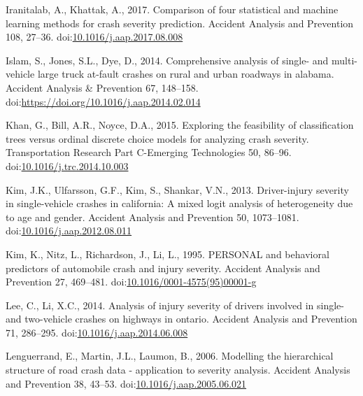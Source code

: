 \documentclass[]{elsarticle} %
\begin{document}
\leavevmode\hypertarget{ref-Iranitalab2017comparison}{}%
Iranitalab, A., Khattak, A., 2017. Comparison of four statistical and
machine learning methods for crash severity prediction. Accident
Analysis and Prevention 108, 27--36.
doi:\href{https://doi.org/10.1016/j.aap.2017.08.008}{10.1016/j.aap.2017.08.008}

\leavevmode\hypertarget{ref-Islam2014comprehensive}{}%
Islam, S., Jones, S.L., Dye, D., 2014. Comprehensive analysis of single-
and multi-vehicle large truck at-fault crashes on rural and urban
roadways in alabama. Accident Analysis \& Prevention 67, 148--158.
doi:\href{https://doi.org/https://doi.org/10.1016/j.aap.2014.02.014}{https://doi.org/10.1016/j.aap.2014.02.014}

\leavevmode\hypertarget{ref-Khan2015exploring}{}%
Khan, G., Bill, A.R., Noyce, D.A., 2015. Exploring the feasibility of
classification trees versus ordinal discrete choice models for analyzing
crash severity. Transportation Research Part C-Emerging Technologies 50,
86--96.
doi:\href{https://doi.org/10.1016/j.trc.2014.10.003}{10.1016/j.trc.2014.10.003}

\leavevmode\hypertarget{ref-Kim2013driver}{}%
Kim, J.K., Ulfarsson, G.F., Kim, S., Shankar, V.N., 2013. Driver-injury
severity in single-vehicle crashes in california: A mixed logit analysis
of heterogeneity due to age and gender. Accident Analysis and Prevention
50, 1073--1081.
doi:\href{https://doi.org/10.1016/j.aap.2012.08.011}{10.1016/j.aap.2012.08.011}

\leavevmode\hypertarget{ref-Kim1995personal}{}%
Kim, K., Nitz, L., Richardson, J., Li, L., 1995. PERSONAL and behavioral
predictors of automobile crash and injury severity. Accident Analysis
and Prevention 27, 469--481.
doi:\href{https://doi.org/10.1016/0001-4575(95)00001-g}{10.1016/0001-4575(95)00001-g}

\leavevmode\hypertarget{ref-Lee2014analysis}{}%
Lee, C., Li, X.C., 2014. Analysis of injury severity of drivers involved
in single- and two-vehicle crashes on highways in ontario. Accident
Analysis and Prevention 71, 286--295.
doi:\href{https://doi.org/10.1016/j.aap.2014.06.008}{10.1016/j.aap.2014.06.008}

\leavevmode\hypertarget{ref-Lenguerrand2006modelling}{}%
Lenguerrand, E., Martin, J.L., Laumon, B., 2006. Modelling the
hierarchical structure of road crash data - application to severity
analysis. Accident Analysis and Prevention 38, 43--53.
doi:\href{https://doi.org/10.1016/j.aap.2005.06.021}{10.1016/j.aap.2005.06.021}
\end{document}
